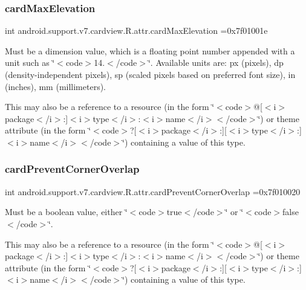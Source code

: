 \subsubsection{\texorpdfstring{card\+Max\+Elevation}{cardMaxElevation}}
{\footnotesize\ttfamily int android.\+support.\+v7.\+cardview.\+R.\+attr.\+card\+Max\+Elevation =0x7f01001e\hspace{0.3cm}{\ttfamily [static]}}

Must be a dimension value, which is a floating point number appended with a unit such as \char`\"{}$<$code$>$14.\+5sp$<$/code$>$\char`\"{}. Available units are\+: px (pixels), dp (density-\/independent pixels), sp (scaled pixels based on preferred font size), in (inches), mm (millimeters). 

This may also be a reference to a resource (in the form \char`\"{}$<$code$>$@\mbox{[}$<$i$>$package$<$/i$>$\+:\mbox{]}$<$i$>$type$<$/i$>$\+:$<$i$>$name$<$/i$>$$<$/code$>$\char`\"{}) or theme attribute (in the form \char`\"{}$<$code$>$?\mbox{[}$<$i$>$package$<$/i$>$\+:\mbox{]}\mbox{[}$<$i$>$type$<$/i$>$\+:\mbox{]}$<$i$>$name$<$/i$>$$<$/code$>$\char`\"{}) containing a value of this type. \mbox{\label{classandroid_1_1support_1_1v7_1_1cardview_1_1R_1_1attr_af7e885084b6d221680d4118f1ead1764}} 
\subsubsection{\texorpdfstring{card\+Prevent\+Corner\+Overlap}{cardPreventCornerOverlap}}
{\footnotesize\ttfamily int android.\+support.\+v7.\+cardview.\+R.\+attr.\+card\+Prevent\+Corner\+Overlap =0x7f010020\hspace{0.3cm}{\ttfamily [static]}}

Must be a boolean value, either \char`\"{}$<$code$>$true$<$/code$>$\char`\"{} or \char`\"{}$<$code$>$false$<$/code$>$\char`\"{}. 

This may also be a reference to a resource (in the form \char`\"{}$<$code$>$@\mbox{[}$<$i$>$package$<$/i$>$\+:\mbox{]}$<$i$>$type$<$/i$>$\+:$<$i$>$name$<$/i$>$$<$/code$>$\char`\"{}) or theme attribute (in the form \char`\"{}$<$code$>$?\mbox{[}$<$i$>$package$<$/i$>$\+:\mbox{]}\mbox{[}$<$i$>$type$<$/i$>$\+:\mbox{]}$<$i$>$name$<$/i$>$$<$/code$>$\char`\"{}) containing a value of this type. \mbox{\label{classandroid_1_1support_1_1v7_1_1cardview_1_1R_1_1attr_a213091aa6628fdf49f3b5c0428bd03de}} 
